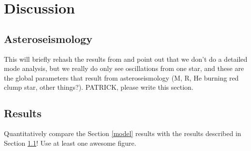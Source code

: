 \section{Discussion}\label{discuss}

\subsection{Asteroseismology}\label{seismo}
This will briefly rehash the results from \citet{gau14} and point out that we don't do a detailed mode analysis, but we really do only see oscillations from one star, and these are the global parameters that result from asteroseismology (M, R, He burning red clump star, other things?). PATRICK, please write this section.

%

\subsection{Results}\label{results}
Quantitatively compare the Section \ref{model} results with the \citet{gau14} results described in Section \ref{seismo}! Use at least one awesome figure.

%
